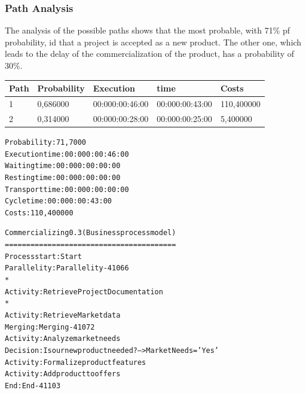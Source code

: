 \subsubsection{Path Analysis}
The analysis of the possible paths shows that the most probable, with 71\%
pf probability, id that a project is accepted as a new product.
The other one, which leads to the delay of the commercialization of the
product, has a probability of 30\%.

\begin{table}[ht!]
\centering
\begin{tabular}{|l|l|l|l|l|}
Path&Probability&Execution&time&Costs\\
\hline
1&0,686000&00:000:00:46:00&00:000:00:43:00&110,400000\\
\hline
2&0,314000&00:000:00:28:00&00:000:00:25:00&5,400000\\
\hline
\end{tabular}
\end{table}


\begin{alltt}
Probability:   71,7000%
Execution time:  00:000:00:46:00
Waiting time:  00:000:00:00:00
Resting time:  00:000:00:00:00
Transport time:  00:000:00:00:00
Cycle time:  00:000:00:43:00
Costs:  110,400000

Commercializing 0.3 (Business process model)
========================================
Process start: Start
Parallelity: Parallelity-41066
    *
    Activity: Retrieve Project Documentation
    *
    Activity: Retrieve Market data
Merging: Merging-41072
Activity: Analyze market needs
Decision: Is our new product needed? --> MarketNeeds = 'Yes'
Activity: Formalize product features
Activity: Add product to offers
End: End-41103
\end{alltt}



